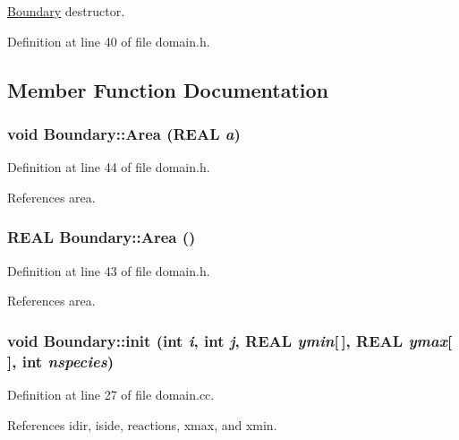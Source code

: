 \hyperlink{structBoundary}{Boundary} destructor. 



Definition at line 40 of file domain.h.

\subsection{Member Function Documentation}
\hypertarget{structBoundary_36aefb40ee2ca353bc730efd0bdf9c63}{
\subsubsection[{Area}]{\setlength{\rightskip}{0pt plus 5cm}void Boundary::Area (REAL {\em a})}}
\label{structBoundary_36aefb40ee2ca353bc730efd0bdf9c63}




Definition at line 44 of file domain.h.

References area.\hypertarget{structBoundary_1e938bb18aab00e839c0c6758229a1c3}{
\subsubsection[{Area}]{\setlength{\rightskip}{0pt plus 5cm}REAL Boundary::Area ()}}
\label{structBoundary_1e938bb18aab00e839c0c6758229a1c3}




Definition at line 43 of file domain.h.

References area.\hypertarget{structBoundary_67865aec3cbeb86d72d70c6ddfefe51d}{
\subsubsection[{init}]{\setlength{\rightskip}{0pt plus 5cm}void Boundary::init (int {\em i}, \/  int {\em j}, \/  REAL {\em ymin}\mbox{[}$\,$\mbox{]}, \/  REAL {\em ymax}\mbox{[}$\,$\mbox{]}, \/  int {\em nspecies})}}
\label{structBoundary_67865aec3cbeb86d72d70c6ddfefe51d}




Definition at line 27 of file domain.cc.

References idir, iside, reactions, xmax, and xmin.

